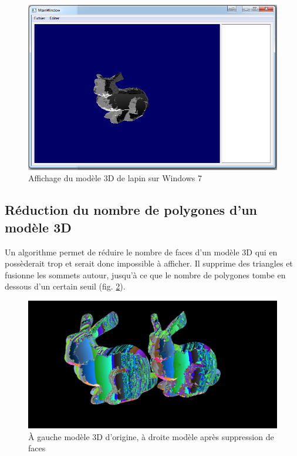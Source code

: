 \begin{figure}[h]
		\centering
		\includegraphics[scale=0.4]{proto_lapin_win7.png}
		\caption{\label{fig:proto_win7} Affichage du modèle 3D de lapin sur Windows 7 }
\end{figure}

\subsection{Réduction du nombre de polygones d’un modèle 3D}

Un algorithme permet de réduire le nombre de faces d’un modèle 3D qui en possèderait trop et serait donc impossible à afficher. Il supprime des triangles et fusionne les sommets autour, jusqu’à ce que le nombre de polygones tombe en dessous d’un certain seuil (fig. \ref{fig:poly_reduc}).
\begin{figure}[h]
		\centering
		\includegraphics[scale=0.4]{polygon_reduction.png}
		\caption{\label{fig:poly_reduc} \`A gauche modèle 3D d'origine, à droite modèle après suppression de faces }
\end{figure}

